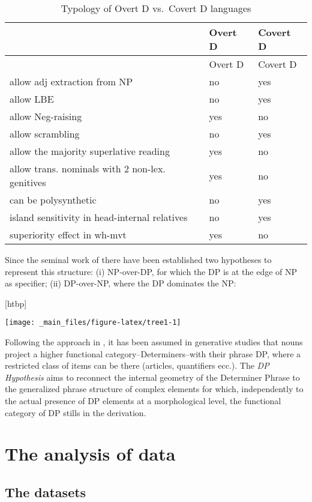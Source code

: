 \documentclass[a4paper,twoside,12pt,chapterprefix=false,listof=flat]{scrartcl}
\makeatletter
\def\fps@figure{htbp}
\renewenvironment{figure}[1][\fps@figure]{
  \edef\@tempa{\noexpand\@float{figure}[#1]} 
  \@tempa
  \sffamily
}{
  \end@float
}
\theoremstyle{plain} %
\theoremstyle{definition}
\theoremstyle{remark}
\makeatother
\begin{document}
\begin{longtable}[]{@{}lll@{}}
\caption{Typology of Overt D vs.~Covert D languages}\tabularnewline
\toprule
& Overt D & Covert D\tabularnewline
\midrule
\endfirsthead
\toprule
& Overt D & Covert D\tabularnewline
\midrule
\endhead
allow adj extraction from NP & no & yes\tabularnewline
allow LBE & no & yes\tabularnewline
allow Neg-raising & yes & no\tabularnewline
allow scrambling & no & yes\tabularnewline
allow the majority superlative reading & yes & no\tabularnewline
allow trans. nominals with 2 non-lex. genitives & yes &
no\tabularnewline
can be polysynthetic & no & yes\tabularnewline
island sensitivity in head-internal relatives & no & yes\tabularnewline
superiority effect in wh-mvt & yes & no\tabularnewline
\bottomrule
\end{longtable}

Since the seminal work of \citep{abney1987} there have been established
two hypotheses to represent this structure: (i) NP-over-DP, for which
the DP is at the edge of NP as specifier; (ii) DP-over-NP, where the DP
dominates the NP:

\begin{figure}

{\centering \texttt{[image: \_main\_files/figure-latex/tree1-1]} 

}

\caption{Phrase structure in NP-over-DP vs. DP-over-NP Hypotheses}\label{fig:tree1}
\end{figure}

Following the approach in \citep{abney1987}, it has been assumed in
generative studies that nouns project a higher functional
category--Determiners--with their phrase DP, where a restricted class of
items can be there (articles, quantifiers ecc.). The \emph{DP
Hypothesis} aims to reconnect the internal geometry of the Determiner
Phrase to the generalized phrase structure of complex elements
\citep{bernstein2008, zamparelli1995} for which, independently to the
actual presence of DP elements at a morphological level, the functional
category of DP stills in the derivation.

\hypertarget{sec:caseStudy}{%
\section{The analysis of data}\label{sec:caseStudy}}

\hypertarget{the-datasets}{%
\subsection{The datasets}\label{the-datasets}}
\end{document}
